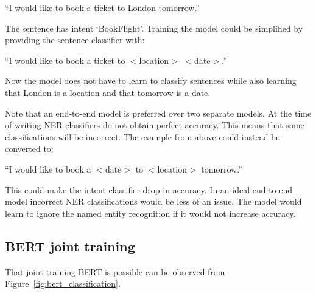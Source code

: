 \begin{center}
    ``I would like to book a ticket to London tomorrow.''
\end{center}

The sentence has intent `BookFlight'.
Training the model could be simplified by providing the sentence classifier with:

\begin{center}
    ``I would like to book a ticket to $<$location$>$ $<$date$>$.''
\end{center}

Now the model does not have to learn to classify sentences while also learning that London is a location and that tomorrow is a date.

Note that an end-to-end model is preferred over two separate models.
At the time of writing NER classifiers do not obtain perfect accuracy.
This means that some classifications will be incorrect.
The example from above could instead be converted to:

\begin{center}
    ``I would like to book a $<$date$>$ to $<$location$>$ tomorrow.''
\end{center}

This could make the intent classifier drop in accuracy.
In an ideal end-to-end model incorrect NER classifications would be less of an issue.
The model would learn to ignore the named entity recognition if it would not increase accuracy.

\subsection{BERT joint training}
\label{subsec:bert_joint_training}
That joint training BERT is possible can be observed from Figure~\ref{fig:bert_classification}.

